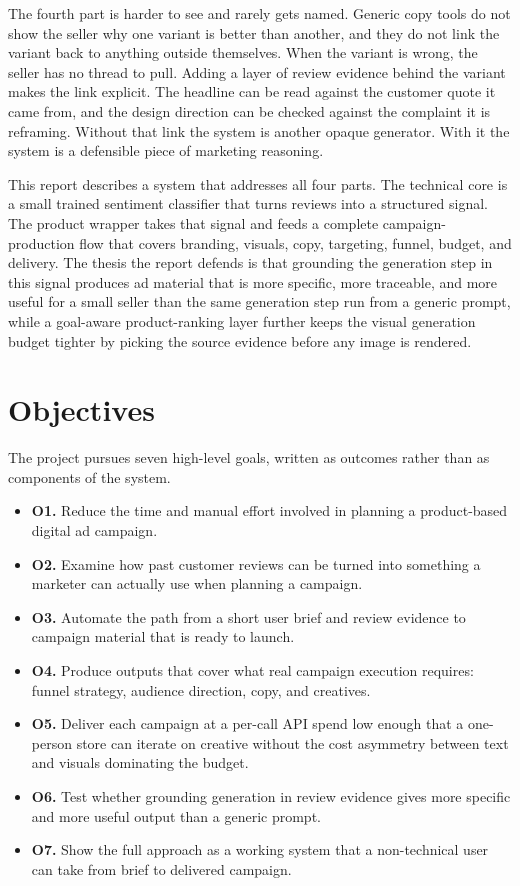 \documentclass[12pt,a4paper]{report}
\begin{document}
The fourth part is harder to see and rarely gets named. Generic copy tools do not show the seller why one variant is better than another, and they do not link the variant back to anything outside themselves. When the variant is wrong, the seller has no thread to pull. Adding a layer of review evidence behind the variant makes the link explicit. The headline can be read against the customer quote it came from, and the design direction can be checked against the complaint it is reframing. Without that link the system is another opaque generator. With it the system is a defensible piece of marketing reasoning.

This report describes a system that addresses all four parts. The technical core is a small trained sentiment classifier that turns reviews into a structured signal. The product wrapper takes that signal and feeds a complete campaign-production flow that covers branding, visuals, copy, targeting, funnel, budget, and delivery. The thesis the report defends is that grounding the generation step in this signal produces ad material that is more specific, more traceable, and more useful for a small seller than the same generation step run from a generic prompt, while a goal-aware product-ranking layer further keeps the visual generation budget tighter by picking the source evidence before any image is rendered.

\section{Objectives}
\label{sec:objectives}

The project pursues seven high-level goals, written as outcomes rather than as components of the system.

\begin{itemize}
  \item \textbf{O1.} Reduce the time and manual effort involved in planning a product-based digital ad campaign.
  \item \textbf{O2.} Examine how past customer reviews can be turned into something a marketer can actually use when planning a campaign.
  \item \textbf{O3.} Automate the path from a short user brief and review evidence to campaign material that is ready to launch.
  \item \textbf{O4.} Produce outputs that cover what real campaign execution requires: funnel strategy, audience direction, copy, and creatives.
  \item \textbf{O5.} Deliver each campaign at a per-call API spend low enough that a one-person store can iterate on creative without the cost asymmetry between text and visuals dominating the budget.
  \item \textbf{O6.} Test whether grounding generation in review evidence gives more specific and more useful output than a generic prompt.
  \item \textbf{O7.} Show the full approach as a working system that a non-technical user can take from brief to delivered campaign.
\end{itemize}
\end{document}
